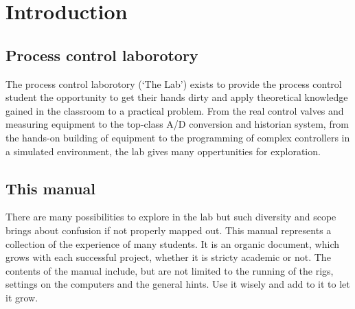 \chapter{Introduction}

\section{Process control laborotory}
The process control laborotory (`The Lab') exists to provide the process control student the opportunity to get their hands dirty and apply theoretical knowledge gained in the classroom to a practical problem.  From the real control valves and measuring equipment to the top-class A/D conversion and historian system, from the hands-on building of equipment to the programming of complex controllers in a simulated environment, the lab gives many oppertunities for exploration.

\section{This manual}
There are many possibilities to explore in the lab but such diversity and scope brings about confusion if not properly mapped out.  This manual represents a collection of the experience of many students.  It is an organic document, which grows with each successful project, whether it is stricty academic or not.  The contents of the manual include, but are not limited to the running of the rigs, settings on the computers and the general hints.  Use it wisely and add to it to let it grow.